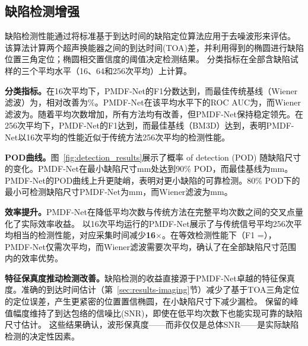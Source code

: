 \subsection{缺陷检测增强}
\label{sec:results-detection}

缺陷检测性能通过将标准基于到达时间的缺陷定位算法应用于去噪波形来评估。
该算法计算两个超声换能器之间的到达时间(TOA)差，并利用得到的椭圆进行缺陷位置三角定位；椭圆相交置信度的阈值决定检测结果。
分类指标在全部含缺陷试样的三个平均水平（16、64和256次平均）上计算。

\textbf{分类指标。}在16次平均下，PMDF-Net的F1分数达到，而最佳传统基线（Wiener滤波）为，相对改善为\%。PMDF-Net在该平均水平下的ROC AUC为，而Wiener滤波为。随着平均次数增加，所有方法均有改善，但PMDF-Net保持稳定领先。在256次平均下，PMDF-Net的F1达到，而最佳基线（BM3D）达到，表明PMDF-Net以16次平均的性能近似于传统方法256次平均的检测性能。

\textbf{POD曲线。}图~\ref{fig:detection_results}展示了概率 of detection (POD) 随缺陷尺寸的变化。PMDF-Net在最小缺陷尺寸mm处达到90\% POD，而最佳基线为mm。PMDF-Net的POD曲线上升更陡峭，表明对更小缺陷的可靠检测。80\% POD下的最小可检测缺陷尺寸PMDF-Net为mm，而Wiener滤波为mm。

\textbf{效率提升。}PMDF-Net在降低平均次数与传统方法在完整平均次数之间的交叉点量化了实际效率收益。
以16次平均运行的PMDF-Net展示了与传统信号平均256次平均相当的检测性能，对应采集时间减少\textbf{16$\times$}。在等效检测性能下（F1 =），PMDF-Net仅需次平均，而Wiener滤波需要次平均，确认了在全部缺陷尺寸范围内的效率优势。

\textbf{特征保真度推动检测改善。}缺陷检测的收益直接源于PMDF-Net卓越的特征保真度。准确的到达时间估计（第~\ref{sec:results-imaging}节）减少了基于TOA三角定位的定位误差，产生更紧密的位置置信椭圆，在小缺陷尺寸下减少漏检。
保留的峰值幅度维持了到达包络的信噪比(SNR)，即使在低平均次数下也能实现可靠的缺陷尺寸估计。
这些结果确认，波形保真度——而非仅仅是总体SNR——是实际缺陷检测的决定性因素。
